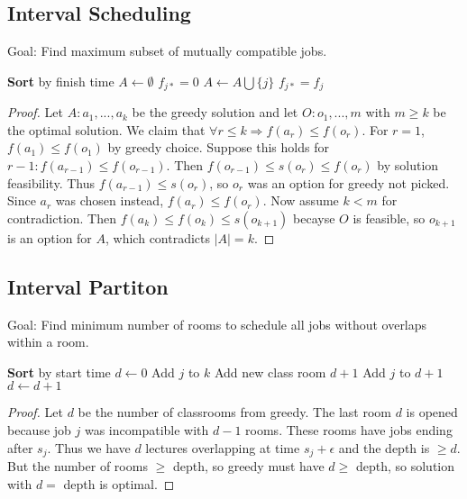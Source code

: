 \subsection*{Interval Scheduling}
Goal: Find maximum subset of mutually compatible jobs. 

\begin{algorithm}[H]
\begin{algorithmic}[1]
\State \textbf{Sort} by finish time
\State $A \gets \emptyset$
\State $f_{j*} = 0$
\State $A \gets A \bigcup \{j\}$
\State $f_{j*} = f_j$
\EndIf
\EndFor
\State {} 
\EndProcedure
\end{algorithmic}
\end{algorithm}

\begin{proof}[Proof]
Let $A: a_1,...,a_k$ be the greedy solution and let $O: o_1,...,m$ with $m \geq k$ be the optimal solution.
We claim that $\forall r \leq k \Rightarrow f(a_r) \leq f(o_r)$. For $r = 1$, $f(a_1) \leq f(o_1)$ by greedy choice.
Suppose this holds for $r-1: f(a_{r-1}) \leq f(o_{r-1})$.
Then $f(o_{r-1}) \leq s(o_r) \leq f(o_r)$ by solution feasibility. 
Thus $f(a_{r-1}) \leq s(o_r)$, so $o_r$ was an option for greedy not picked. 
Since $a_r$ was chosen instead, $f(a_r) \leq f(o_r)$. 
Now assume $k < m$ for contradiction. 
Then $f(a_k) \leq f(o_k) \leq s(o_{k+1})$ becayse $O$ is feasible, so $o_{k+1}$ is an option for $A$, which contradicts $|A| = k$. 
\end{proof}

\subsection*{Interval Partiton}
Goal: Find minimum number of rooms to schedule all jobs without overlaps within a room. 

\begin{algorithm}[H]
\begin{algorithmic}[1]
\State \textbf{Sort} by start time
\State $d \gets 0$
\State Add $j$ to $k$
\Else
\State Add new class room $d + 1$
\State Add $j$ to $d+1$
\State $d \gets d+1$ 
\EndIf
\EndFor
\EndProcedure
\end{algorithmic}
\end{algorithm}
\begin{proof}[Proof]
Let $d$ be the number of classrooms from greedy. 
The last room $d$ is opened because job $j$ was incompatible with $d - 1$ rooms. 
These rooms have jobs ending after $s_j$.
Thus we have $d$ lectures overlapping at time $s_j + \epsilon$ and the depth is $\geq d$.
But the number of rooms $\geq$ depth, so greedy must have $d \geq $ depth, so solution with $d = $ depth is optimal. 
\end{proof}

